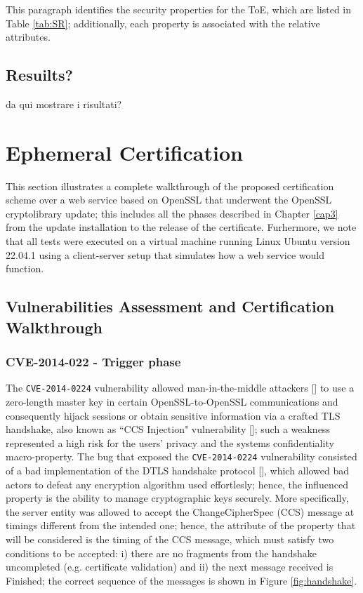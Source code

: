 \vspace{.75em}

\noindent{}This paragraph identifies the security properties for the ToE, which are listed in Table \ref{tab:SR}; additionally, each property is associated with the relative attributes.

\subsection{Resuilts?}
da qui mostrare i risultati?









\section{Ephemeral Certification}
This section illustrates a complete walkthrough of the proposed certification scheme over a web service based on OpenSSL that underwent the OpenSSL cryptolibrary update; this includes all the phases described in Chapter \ref{cap3} from the update installation to the release of the certificate. Furhermore, we note that all tests were executed on a virtual machine running Linux Ubuntu version 22.04.1 using a client-server setup that simulates how a web service would function.



\subsection{Vulnerabilities Assessment and Certification Walkthrough}
\subsubsection{CVE-2014-022 - Trigger phase}
The \texttt{CVE-2014-0224} vulnerability allowed man-in-the-middle attackers [] to use a zero-length master key in certain OpenSSL-to-OpenSSL communications and consequently hijack sessions or obtain sensitive information via a crafted TLS handshake, also known as ``CCS Injection" vulnerability []; such a weakness represented a high risk for the users' privacy and the systems confidentiality macro-property.
The bug that exposed the \texttt{CVE-2014-0224} vulnerability consisted of a bad implementation of the DTLS handshake protocol [], which allowed bad actors to defeat any encryption algorithm used effortlesly; hence, the influenced property is the ability to manage cryptographic keys securely. More specifically, the server entity was allowed to accept the ChangeCipherSpec (CCS) message at timings different from the intended one; hence, the attribute of the property that will be considered is the timing of the CCS message, which must satisfy two conditions to be accepted: i) there are no fragments from the handshake uncompleted (e.g. certificate validation) and ii) the next message received is Finished; the correct sequence of the messages is shown in Figure \ref{fig:handshake}.

